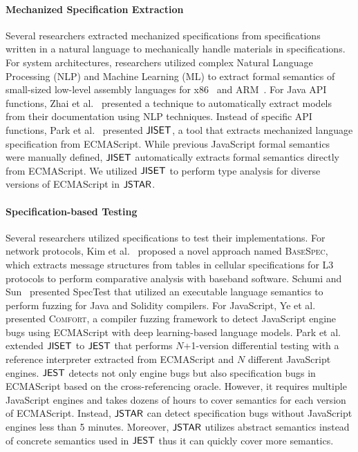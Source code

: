 \paragraph{Mechanized Specification Extraction}
Several researchers extracted mechanized specifications from specifications
written in a natural language to mechanically handle materials in
specifications.  For system architectures, researchers utilized complex Natural
Language Processing (NLP) and Machine Learning (ML) to extract formal semantics
of small-sized low-level assembly languages for x86~\cite{x86} and
ARM~\cite{arm}.  For Java API functions, Zhai et al.~\cite{javadoc} presented a
technique to automatically extract models from their documentation using NLP
techniques.  Instead of specific API functions, Park et al.~\cite{jiset}
presented $\jiset$, a tool that extracts mechanized language specification from
ECMAScript.  While previous JavaScript formal semantics~\cite{lambdajs, jscert,
kjs} were manually defined, $\jiset$ automatically extracts formal semantics
directly from ECMAScript.  We utilized $\jiset$ to perform type analysis for
diverse versions of ECMAScript in $\tool$.

\paragraph{Specification-based Testing}
Several researchers utilized specifications to test their implementations.  For
network protocols, Kim et al.~\cite{basespec} proposed a novel approach named
\textsc{BaseSpec}, which extracts message structures from tables in cellular
specifications for L3 protocols to perform comparative analysis with baseband
software.  Schumi and Sun~\cite{spectest} presented SpecTest that utilized an
executable language semantics to perform fuzzing for Java and Solidity
compilers.  For JavaScript, Ye et al.~\cite{comfort} presented \textsc{Comfort}, a
compiler fuzzing framework to detect JavaScript engine bugs using ECMAScript
with deep learning-based language models.  Park et al.~\cite{jest} extended
$\jiset$ to $\jest$ that performs $N$+1-version differential testing with a
reference interpreter extracted from ECMAScript and $N$ different JavaScript
engines.  $\jest$ detects not only engine bugs but also specification bugs in
ECMAScript based on the cross-referencing oracle.  However, it requires multiple
JavaScript engines and takes dozens of hours to cover semantics for each version
of ECMAScript.  Instead, $\tool$ can detect specification bugs without
JavaScript engines less than 5 minutes.  Moreover, $\tool$ utilizes abstract
semantics instead of concrete semantics used in $\jest$ thus it can quickly
cover more semantics.
